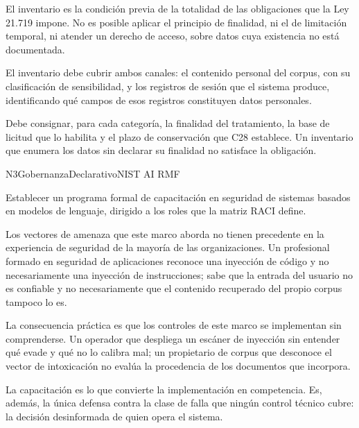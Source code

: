 El inventario es la condición previa de la totalidad de las obligaciones que la Ley 21.719 impone. No es posible aplicar el principio de finalidad, ni el de limitación temporal, ni atender un derecho de acceso, sobre datos cuya existencia no está documentada.

El inventario debe cubrir ambos canales: el contenido personal del corpus, con su clasificación de sensibilidad, y los registros de sesión que el sistema produce, identificando qué campos de esos registros constituyen datos personales.

Debe consignar, para cada categoría, la finalidad del tratamiento, la base de licitud que lo habilita y el plazo de conservación que C28 establece. Un inventario que enumera los datos sin declarar su finalidad no satisface la obligación.


  {N3}{Gobernanza}{Declarativo}{NIST AI RMF}

Establecer un programa formal de capacitación en seguridad de sistemas basados en modelos de lenguaje, dirigido a los roles que la matriz RACI define.

Los vectores de amenaza que este marco aborda no tienen precedente en la experiencia de seguridad de la mayoría de las organizaciones. Un profesional formado en seguridad de aplicaciones reconoce una inyección de código y no necesariamente una inyección de instrucciones; sabe que la entrada del usuario no es confiable y no necesariamente que el contenido recuperado del propio corpus tampoco lo es.

La consecuencia práctica es que los controles de este marco se implementan sin comprenderse. Un operador que despliega un escáner de inyección sin entender qué evade y qué no lo calibra mal; un propietario de corpus que desconoce el vector de intoxicación no evalúa la procedencia de los documentos que incorpora.

La capacitación es lo que convierte la implementación en competencia. Es, además, la única defensa contra la clase de falla que ningún control técnico cubre: la decisión desinformada de quien opera el sistema.

